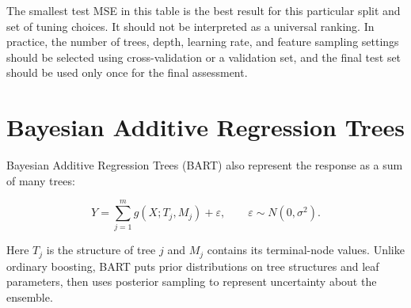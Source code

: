 \documentclass[
  11pt,
]{article}
\newenvironment{Shaded}{\begin{snugshade}}{\end{snugshade}}
\newcommand{\AttributeTok}[1]{\textcolor[rgb]{0.13,0.29,0.53}{#1}}
\newcommand{\DecValTok}[1]{\textcolor[rgb]{0.00,0.00,0.81}{#1}}
\newcommand{\FunctionTok}[1]{\textcolor[rgb]{0.13,0.29,0.53}{\textbf{#1}}}
\newcommand{\NormalTok}[1]{#1}
\newcommand{\OtherTok}[1]{\textcolor[rgb]{0.56,0.35,0.01}{#1}}
\newcommand{\SpecialCharTok}[1]{\textcolor[rgb]{0.81,0.36,0.00}{\textbf{#1}}}
\newcommand{\StringTok}[1]{\textcolor[rgb]{0.31,0.60,0.02}{#1}}
\begin{document}
The smallest test MSE in this table is the best result for this
particular split and set of tuning choices. It should not be interpreted
as a universal ranking. In practice, the number of trees, depth,
learning rate, and feature sampling settings should be selected using
cross-validation or a validation set, and the final test set should be
used only once for the final assessment.

\section{Bayesian Additive Regression
Trees}\label{bayesian-additive-regression-trees}

Bayesian Additive Regression Trees (BART) also represent the response as
a sum of many trees:

\[
Y = \sum_{j=1}^{m} g(X; T_j, M_j) + \varepsilon,
\qquad \varepsilon \sim N(0, \sigma^2).
\]

Here \(T_j\) is the structure of tree \(j\) and \(M_j\) contains its
terminal-node values. Unlike ordinary boosting, BART puts prior
distributions on tree structures and leaf parameters, then uses
posterior sampling to represent uncertainty about the ensemble.

\begin{Shaded}
\end{Shaded}
\end{document}

